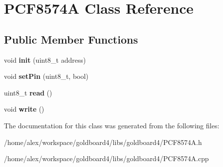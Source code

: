 \hypertarget{class_p_c_f8574_a}{}\section{P\+C\+F8574A Class Reference}
\label{class_p_c_f8574_a}
\subsection*{Public Member Functions}
\begin{DoxyCompactItemize}
\item 
void {\bfseries init} (uint8\+\_\+t address)\hypertarget{class_p_c_f8574_a_a2baf2fa7b7a4fb667fe172cb3223d3ed}{}\label{class_p_c_f8574_a_a2baf2fa7b7a4fb667fe172cb3223d3ed}

\item 
void {\bfseries set\+Pin} (uint8\+\_\+t, bool)\hypertarget{class_p_c_f8574_a_a8612893eb323b38c8c31fb1e415b9eff}{}\label{class_p_c_f8574_a_a8612893eb323b38c8c31fb1e415b9eff}

\item 
uint8\+\_\+t {\bfseries read} ()\hypertarget{class_p_c_f8574_a_ab8bbb865bc98e8f4c2fdc5b30d81df43}{}\label{class_p_c_f8574_a_ab8bbb865bc98e8f4c2fdc5b30d81df43}

\item 
void {\bfseries write} ()\hypertarget{class_p_c_f8574_a_ab462fef7ab449d66c921913c7b5608e4}{}\label{class_p_c_f8574_a_ab462fef7ab449d66c921913c7b5608e4}

\end{DoxyCompactItemize}


The documentation for this class was generated from the following files\+:\begin{DoxyCompactItemize}
\item 
/home/alex/workspace/goldboard4/libs/goldboard4/P\+C\+F8574\+A.\+h\item 
/home/alex/workspace/goldboard4/libs/goldboard4/P\+C\+F8574\+A.\+cpp\end{DoxyCompactItemize}
